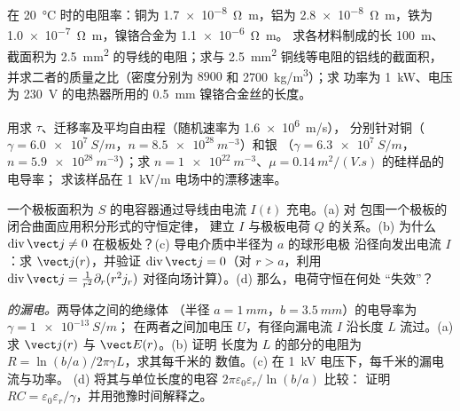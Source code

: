 \begin{exercise}[$\star$]\label{exo:b2:charges-currents-conduction:3}
在 \qty{20}{\degreeCelsius} 时的电阻率：铜为 \qty{1.7e-8}{\ohm.m}，铝为
\qty{2.8e-8}{\ohm.m}，铁为 \qty{1.0e-7}{\ohm.m}，镍铬合金为 \qty{1.1e-6}{\ohm.m}。
求各材料制成的长 \qty{100}{m}、截面积为 \qty{2.5}{mm^2} 的导线的电阻；求与
\qty{2.5}{mm^2} 铜线等电阻的铝线的截面积，并求二者的质量之比（密度分别为
$8900$ 和 \qty{2700}{kg/m^3}）；求
功率为 \qty{1}{kW}、电压为 \qty{230}{V} 的电热器所用的 \qty{0.5}{mm} 镍铬合金丝的长度。
\end{exercise}

\begin{exercise}[$\star$]\label{exo:b2:charges-currents-conduction:4}
用求 $\tau$、迁移率及平均自由程（随机速率为 \qty{1.6e6}{m/s}），
分别针对铜（$\gamma = \qty{6.0e7}{S/m}$，$n = \qty{8.5e28}{m^{-3}}$）和银
（$\gamma = \qty{6.3e7}{S/m}$，$n = \qty{5.9e28}{m^{-3}}$）；求
$n = \qty{1e22}{m^{-3}}$、$\mu = \qty{0.14}{m^2/(V.s)}$ 的硅样品的电导率；
求该样品在 \qty{1}{kV/m} 电场中的漂移速率。
\end{exercise}

\begin{exercise}[$\star\star$]\label{exo:b2:charges-currents-conduction:5}
一个极板面积为 $S$ 的电容器通过导线由电流 $I(t)$ 充电。(a) 对
包围一个极板的闭合曲面应用积分形式的守恒定律，
建立 $I$ 与极板电荷 $Q$ 的关系。(b) 为什么 $\operatorname{div}\vect j \ne 0$
在极板处？(c) 导电介质中半径为 $a$ 的球形电极
沿径向发出电流 $I$：求 $\vect j(r)$，并验证 $\operatorname{div}
\vect j = 0$（对 $r > a$，利用 $\operatorname{div}\vect j = \frac1{r^2}\partial_r(r^2j_r)$
对径向场计算）。(d) 那么，电荷守恒在何处
“失效”？
\end{exercise}

\begin{exercise}[$\star\star$]\label{exo:b2:charges-currents-conduction:6}
\emph{的漏电。}两导体之间的绝缘体
（半径 $a = \qty{1}{mm}$，$b = \qty{3.5}{mm}$）的电导率为 $\gamma = \qty{1e-13}{S/m}$；
在两者之间加电压 $U$，有径向漏电流 $I$
沿长度 $L$ 流过。(a) 求 $\vect j(r)$ 与 $\vect E(r)$。(b) 证明
长度为 $L$ 的部分的电阻为 $R = \ln(b/a)/2\pi\gamma L$，求其每千米的
数值。(c) 在 \qty{1}{kV} 电压下，每千米的漏电流与功率。
(d) 将其与单位长度的电容 $2\pi\varepsilon_0\varepsilon_r/\ln(b/a)$ 比较：
证明 $RC = \varepsilon_0\varepsilon_r/\gamma$，并用弛豫时间解释之。
\end{exercise}

